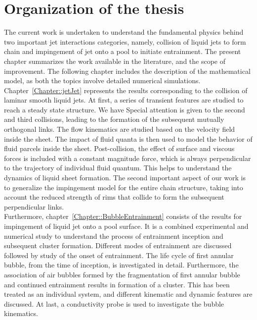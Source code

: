\section{Organization of the thesis}
The current work is undertaken to understand the fundamental physics behind two important jet interactions categories, namely, collision of liquid jets to form chain and impingement of jet onto a pool to initiate entrainment. The present chapter summarizes the work available in the literature, and the scope of improvement. The following chapter includes the description of the mathematical model, as both the topics involve detailed numerical simulations. Chapter~\ref{Chapter::jetJet} represents the results corresponding to the collision of laminar smooth liquid jets. At first, a series of transient features are studied to reach a steady state structure. We have  Special attention is given to the second and third collisions, leading to the formation of the subsequent mutually orthogonal links. The flow kinematics are studied based on the velocity field inside the sheet. The impact of fluid quanta is then used to model the behavior of fluid parcels inside the sheet. Post-collision, the effect of surface and viscous forces is included with a constant magnitude force, which is always perpendicular to the trajectory of individual fluid quantum. This helps to understand the dynamics of liquid sheet formation. The second important aspect of our work is to generalize the impingement model for the entire chain structure, taking into account the reduced strength of rims that collide to form the subsequent perpendicular links.\\
Furthermore, chapter~\ref{Chapter::BubbleEntrainment} consists of the results for impingement of liquid jet onto a pool surface. It is a combined experimental and numerical study to understand the process of entrainment inception and subsequent cluster formation. Different modes of entrainment are discussed followed by study of the onset of entrainment. The life cycle of first annular bubble, from the time of inception, is investigated in detail. Furthermore, the association of air bubbles formed by the fragmentation of first annular bubble and continued entrainment results in formation of a cluster. This has been treated as an individual system, and different kinematic and dynamic features are discussed. At last, a conductivity probe is used to investigate the bubble kinematics.
